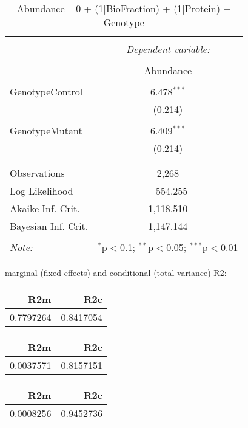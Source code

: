 \documentclass[11pt]{report}
\begin{document}
\begin{table}[!htbp] \centering 
  \caption{Abundance ~ 0 + (1|BioFraction) + (1|Protein) + Genotype} 
  \label{} 
\begin{tabular}{@{\extracolsep{5pt}}lc} 
\\[-1.8ex]\hline 
\hline \\[-1.8ex] 
 & \multicolumn{1}{c}{\textit{Dependent variable:}} \\ 
\cline{2-2} 
\\[-1.8ex] & Abundance \\ 
\hline \\[-1.8ex] 
 GenotypeControl & 6.478$^{***}$ \\ 
  & (0.214) \\ 
  & \\ 
 GenotypeMutant & 6.409$^{***}$ \\ 
  & (0.214) \\ 
  & \\ 
\hline \\[-1.8ex] 
Observations & 2,268 \\ 
Log Likelihood & $-$554.255 \\ 
Akaike Inf. Crit. & 1,118.510 \\ 
Bayesian Inf. Crit. & 1,147.144 \\ 
\hline 
\hline \\[-1.8ex] 
\textit{Note:}  & \multicolumn{1}{r}{$^{*}$p$<$0.1; $^{**}$p$<$0.05; $^{***}$p$<$0.01} \\ 
\end{tabular} 
\end{table} 
marginal (fixed effects) and conditional (total variance) R2:

\begin{tabular}{r|r}
\hline
R2m & R2c\\
\hline
0.7797264 & 0.8417054\\
\hline
\end{tabular}

\begin{tabular}{r|r}
\hline
R2m & R2c\\
\hline
0.0037571 & 0.8157151\\
\hline
\end{tabular}

\begin{tabular}{r|r}
\hline
R2m & R2c\\
\hline
0.0008256 & 0.9452736\\
\hline
\end{tabular}
\end{document}
